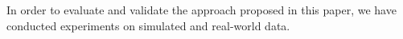 In order to evaluate and validate the approach proposed in this paper, we have
conducted experiments on simulated and real-world data.
